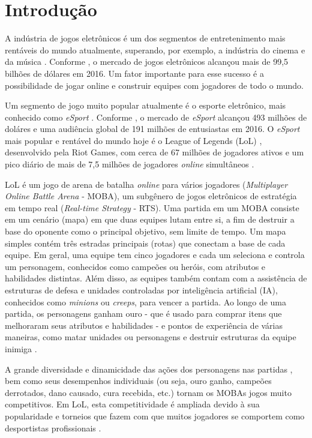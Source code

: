 \chapter{Introdu\c{c}\~{a}o}

A indústria de jogos eletrônicos é um dos segmentos de entretenimento mais rentáveis do mundo atualmente, superando, por exemplo, a indústria do cinema e da música \cite{newzoo1} \cite{ifpi1} \cite{mpaa1}. Conforme \cite{newzoo1}, o mercado de jogos eletrônicos alcançou mais de 99,5 bilhões de dólares em 2016. Um fator importante para esse sucesso é a possibilidade de jogar online e construir equipes com jogadores de todo o mundo.

Um segmento de jogo muito popular atualmente é o esporte eletrônico, mais conhecido como \textit{eSport} \cite{forbes1}. Conforme \cite{newzoo2}, o mercado de \textit{eSport} alcançou 493 milhões de doláres e uma audiência global de 191 milhões de entusiastas em 2016. O \textit{eSport} mais popular e rentável do mundo hoje é o League of Legends (LoL)  \cite{superdata1}, desenvolvido pela Riot Games, com cerca de 67 milhões de jogadores ativos e um pico diário de mais de 7,5 milhões de jogadores \textit{online} simultâneos \cite{riot1}.

LoL é um jogo de arena de batalha \textit{online} para vários jogadores (\textit{Multiplayer Online Battle Arena} - MOBA), um subgênero de jogos eletrônicos de estratégia em tempo real (\textit{Real-time Strategy} - RTS). Uma partida em um MOBA consiste em um cenário (mapa) em que duas equipes lutam entre si, a fim de destruir a base do oponente como o principal objetivo, sem limite de tempo. Um mapa simples contém três estradas principais (rotas) que conectam a base de cada equipe. Em geral, uma equipe tem cinco jogadores e cada um seleciona e controla um personagem, conhecidos como campeões ou heróis, com atributos e habilidades distintas. Além disso, as equipes também contam com a assistência de estruturas de defesa e unidades controladas por inteligência artificial (IA), conhecidos como \textit{minions} ou \textit{creeps}, para vencer a partida. Ao longo de uma partida, os personagens ganham ouro - que é usado para comprar itens que melhoraram seus atributos e habilidades - e pontos de experiência de várias maneiras, como matar unidades ou personagens e destruir estruturas da equipe inimiga \cite{league1}.

A grande diversidade e dinamicidade das ações dos personagens nas partidas \cite{drachen2014skill}, bem como seus desempenhos individuais (ou seja, ouro ganho, campeões derrotados, dano causado, cura recebida, etc.) tornam os MOBAs jogos muito competitivos. Em LoL, esta competitividade é ampliada devido à sua popularidade e torneios que fazem com que muitos jogadores se comportem como desportistas profissionais \cite{rioult2014mining}.

